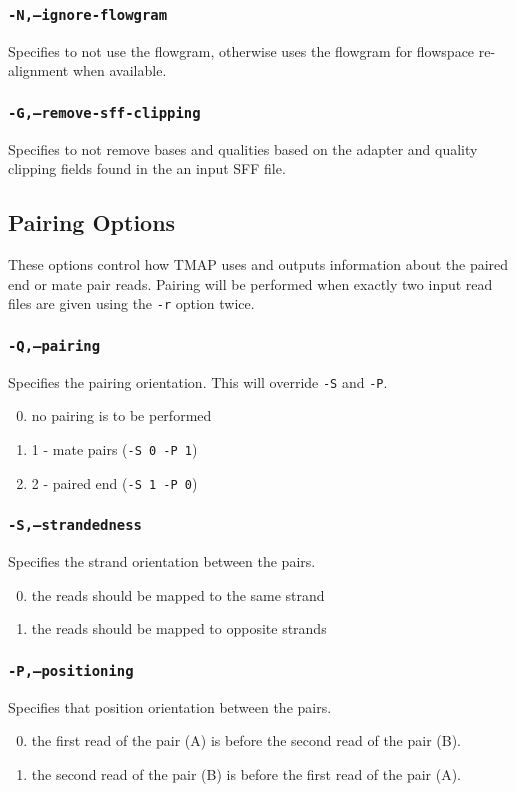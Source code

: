 \documentclass[a4paper,12pt]{book}
\newcommand{\TT}[1]{{\tt #1}} %
\begin{document}
\subsubsection{\TT{-N,--ignore-flowgram}}
Specifies to not use the flowgram, otherwise uses the flowgram for flowspace re-alignment when available.

\subsubsection{\TT{-G,--remove-sff-clipping}}
Specifies to not remove bases and qualities based on the adapter and quality clipping fields found in the an input SFF file.

\subsection{Pairing Options}
These options control how TMAP uses and outputs information about the paired end or mate pair reads.
Pairing will be performed when exactly two input read files are given using the \TT{-r} option twice.

\subsubsection{\TT{-Q,--pairing}}
Specifies the pairing orientation.
This will override \TT{-S} and \TT{-P}.
\begin{enumerate}
	\setcounter{enumi}{-1} %
	\item no pairing is to be performed
	\item 1 - mate pairs (\TT{-S 0 -P 1})
	\item 2 - paired end (\TT{-S 1 -P 0})
\end{enumerate}

\subsubsection{\TT{-S,--strandedness}}
Specifies the strand orientation between the pairs.
\begin{enumerate}
	\setcounter{enumi}{-1} %
	\item the reads should be mapped to the same strand
	\item the reads should be mapped to opposite strands
\end{enumerate}

\subsubsection{\TT{-P,--positioning}}
Specifies that position orientation between the pairs.
\begin{enumerate}
	\setcounter{enumi}{-1} %
	\item the first read of the pair (A) is before the second read of the pair (B).
	\item the second read of the pair (B) is before the first read of the pair (A).
\end{enumerate}
\end{document}
